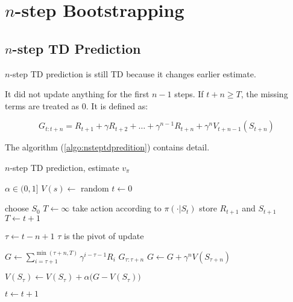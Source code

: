 \section{$n$-step Bootstrapping}

\subsection{$n$-step TD Prediction}

$n$-step TD prediction is still TD because it changes earlier estimate.

It did not update anything for the first $n-1$ steps. If $t + n \geq T$, the missing terms are treated as $0$. It is defined as:

\begin{equation}
	G_{t:t+n} = R_{t+1} + \gamma R_{t+2} + \dots + \gamma^{n-1} R_{t+n} + \gamma^n V_{t+n-1}(S_{t+n})
\end{equation}


The algorithm (\ref{algo:nsteptdpredition}) contains detail.


\begin{algorithm}
	\caption{$n$-step TD prediction, estimate $v_\pi$}\label{algo:nsteptdpredition}	
	
	\begin{algorithmic}[1]
		\State $ \alpha \in (0,1]$
		\State $V(s) \gets$ random
		\State $t \gets 0$
		
		\Statex
		
		\Loop
			\State choose $S_0$
			\State $T \gets \infty$
					\State take action according to $\pi(\cdot|S_t)$
					\State store $R_{t+1}$ and $S_{t+1}$
						\State $T \gets t+1$
					\EndIf
				\EndIf
				
				\State $\tau \gets t - n + 1$ \Comment $\tau$ is the pivot of update
				
					\State $G \gets \sum\limits_{i=\tau+1}^{\min (\tau+n,T)} \gamma^{i-\tau-1} R_i$ \Comment $G_{\tau:\tau+n}$
						\State $G \gets G + \gamma^n V(S_{\tau + n})$
					\EndIf
					
					\State $V(S_\tau) \gets V(S_\tau) + \alpha \Big(G - V(S_\tau)\Big)$
				\EndIf

				\State $t \gets t+1$
			\EndWhile
		\EndLoop
	\end{algorithmic}
\end{algorithm}



